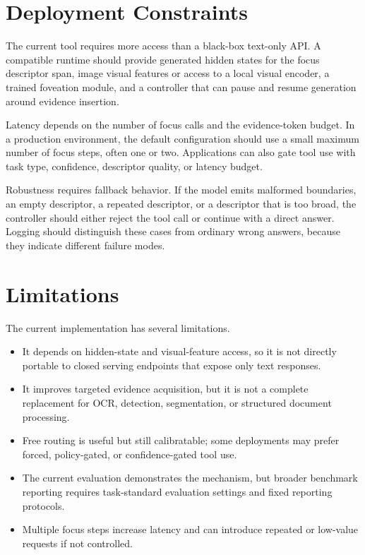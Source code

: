 \documentclass[10pt,twocolumn]{article}
\begin{document}
\section{Deployment Constraints}

The current tool requires more access than a black-box text-only API. A compatible runtime should provide generated hidden states for the focus descriptor span, image visual features or access to a local visual encoder, a trained foveation module, and a controller that can pause and resume generation around evidence insertion.

Latency depends on the number of focus calls and the evidence-token budget. In a production environment, the default configuration should use a small maximum number of focus steps, often one or two. Applications can also gate tool use with task type, confidence, descriptor quality, or latency budget.

Robustness requires fallback behavior. If the model emits malformed boundaries, an empty descriptor, a repeated descriptor, or a descriptor that is too broad, the controller should either reject the tool call or continue with a direct answer. Logging should distinguish these cases from ordinary wrong answers, because they indicate different failure modes.

\section{Limitations}

The current implementation has several limitations.

\begin{itemize}
  \item It depends on hidden-state and visual-feature access, so it is not directly portable to closed serving endpoints that expose only text responses.
  \item It improves targeted evidence acquisition, but it is not a complete replacement for OCR, detection, segmentation, or structured document processing.
  \item Free routing is useful but still calibratable; some deployments may prefer forced, policy-gated, or confidence-gated tool use.
  \item The current evaluation demonstrates the mechanism, but broader benchmark reporting requires task-standard evaluation settings and fixed reporting protocols.
  \item Multiple focus steps increase latency and can introduce repeated or low-value requests if not controlled.
\end{itemize}
\end{document}
